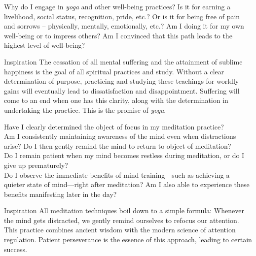 \newpage
\begin{mananam}{}
\mananamtext Why do I engage in \emph{yoga} and other well-being practices? Is it for earning a livelihood, social status, recognition, pride, etc.? Or is it for being free of pain and sorrows – physically, mentally, emotionally, etc.? Am I doing it for my own well-being or to impress others? Am I convinced that this path leads to the highest level of well-being?
\end{mananam}
\WritingHand{}
\begin{inspiration}{\mananamfont Inspiration}
\mananamtext The cessation of all mental suffering and the attainment of sublime happiness is the goal of all spiritual practices and study. Without a clear determination of purpose, practicing and studying these teachings for worldly gains will eventually lead to dissatisfaction and disappointment. Suffering will come to an end when one has this clarity, along with the determination in undertaking the practice. This is the promise of \emph{yoga}.
\end{inspiration}
\newpage



\newpage
\begin{mananam}{}
\mananamtext Have I clearly determined the object of focus in my meditation practice?\\
Am I consistently maintaining awareness of the mind even when distractions arise? Do I then gently remind the mind to return to object of meditation?\\
Do I remain patient when my mind becomes restless during meditation, or do I give up prematurely?\\
Do I observe the immediate benefits of mind training—such as achieving a quieter state of mind—right after meditation? Am I also able to experience these benefits manifesting later in the day? 
\end{mananam}
\WritingHand{}
\begin{inspiration}{\mananamfont Inspiration}
\mananamtext All meditation techniques boil down to a simple formula: Whenever the mind gets distracted, we gently remind ourselves to refocus our attention. This practice combines ancient wisdom with the modern science of attention regulation. Patient perseverance is the essence of this approach, leading to certain success.
\end{inspiration}
\newpage

